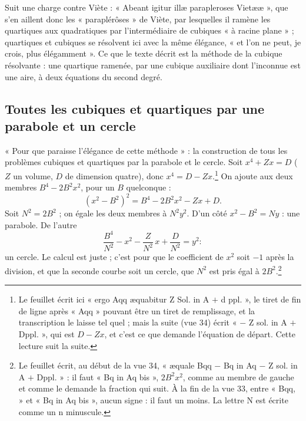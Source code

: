 \documentclass[11pt,a4paper]{article}
\begin{document}
Suit une charge contre Viète : « Abeant igitur illæ parapleroses Vietææ », que
s'en aillent donc les « paraplérôses » de Viète, par lesquelles il ramène les
quartiques aux quadratiques par l'intermédiaire de cubiques « à racine plane » ;
quartiques et cubiques se résolvent ici avec la même élégance, « et l'on ne
peut, je crois, plus élégamment ». Ce que le texte décrit est la méthode de la
cubique résolvante : une quartique ramenée, par une cubique auxiliaire dont
l'inconnue est une aire, à deux équations du second degré.

\subsection*{Toutes les cubiques et quartiques par une parabole et un cercle}

« Pour que paraisse l'élégance de cette méthode » : la construction de tous les
problèmes cubiques et quartiques par la parabole et le cercle. Soit
$x^4 + Zx = D$ ($Z$ un volume, $D$ de dimension quatre), donc
$x^4 = D - Zx$.\footnote{Le feuillet écrit ici « ergo Aqq æquabitur Z Sol. in A
$+$ d ppl. », le tiret de fin de ligne après « Aqq » pouvant être un tiret de
remplissage, et la transcription le laisse tel quel ; mais la suite (vue 34)
écrit « $-$ Z sol. in A $+$ Dppl. », qui est $D - Zx$, et c'est ce que demande
l'équation de départ. Cette lecture suit la suite.} On ajoute aux deux membres
$B^4 - 2B^2x^2$, pour un $B$ quelconque :
\[ (x^2 - B^2)^2 = B^4 - 2B^2x^2 - Zx + D . \]
Soit $N^2 = 2B^2$ ; on égale les deux membres à $N^2y^2$. D'un côté
$x^2 - B^2 = Ny$ : une parabole. De l'autre
\[ \frac{B^4}{N^2} - x^2 - \frac{Z}{N^2}\,x + \frac{D}{N^2} = y^2 : \]
un cercle. Le calcul est juste ; c'est pour que le coefficient de $x^2$ soit
$-1$ après la division, et que la seconde courbe soit un cercle, que $N^2$ est
pris égal à $2B^2$.\footnote{Le feuillet écrit, au début de la vue 34, « æquale
Bqq $-$ Bq in Aq $-$ Z sol. in A $+$ Dppl. » : il faut « Bq in Aq bis »,
$2B^2x^2$, comme au membre de gauche et comme le demande la fraction qui suit.
À la fin de la vue 33, entre « Bqq, » et « Bq in Aq bis », aucun signe : il
faut un moins. La lettre N est écrite comme un n minuscule.}
\end{document}
